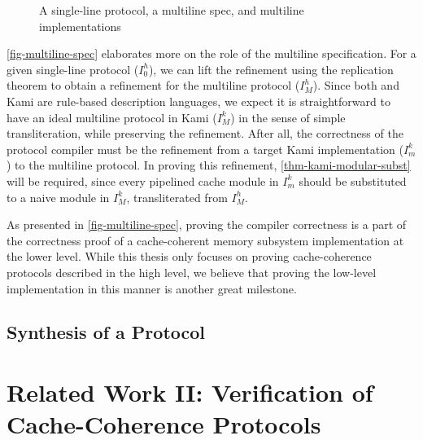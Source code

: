 \begin{figure}[t]
  \centering
  \caption{A single-line protocol, a multiline spec, and multiline implementations}
  \label{fig-multiline-spec}
\end{figure}

\autoref{fig-multiline-spec} elaborates more on the role of the multiline specification.
For a given \hemiola{} single-line protocol ($I^{h}_{0}$), we can lift the refinement using the replication theorem to obtain a refinement for the multiline protocol ($I^{h}_{M}$).
Since both \hemiola{} and Kami are rule-based description languages, we expect it is straightforward to have an ideal multiline protocol in Kami ($I^{k}_{M}$) in the sense of simple transliteration, while preserving the refinement.
After all, the correctness of the protocol compiler must be the refinement from a target Kami implementation ($I^{k}_{m}$) to the multiline protocol.
In proving this refinement, \autoref{thm-kami-modular-subst} will be required, since every pipelined cache module in $I^{k}_{m}$ should be substituted to a naive module in $I^{k}_{M}$, transliterated from $I^{h}_{M}$.

As presented in \autoref{fig-multiline-spec}, proving the compiler correctness is a part of the correctness proof of a cache-coherent memory subsystem implementation at the lower level.
While this thesis only focuses on proving cache-coherence protocols described in the high level, we believe that proving the low-level implementation in this manner is another great milestone.

\section{Synthesis of a \hemiola{} Protocol}
\label{sec-synthesis}

\chapter{Related Work II: Verification of Cache-Coherence Protocols}
